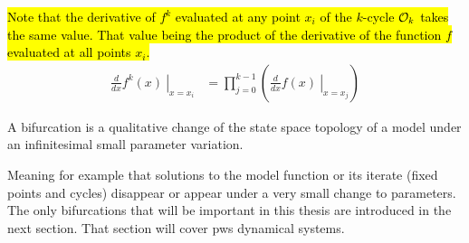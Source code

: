 \hl{
	Note that the derivative of $f^k$ evaluated at any point $x_i$ of the $k$-cycle $\mathcal{O}_k$ takes the same value.
	That value being the product of the derivative of the function $f$ evaluated at all points $x_i$.
}
\begin{align}
	\left. \frac{d}{dx}f^k(x) \:\right|_{x = x_i} & = \prod_{j=0}^{k-1} \left( \left. \frac{d}{dx} f(x) \:\right|_{x = x_j} \right)
\end{align}


\begin{definition}[Bifurcation]
	A bifurcation is a qualitative change of the state space topology of a model under an infinitesimal small parameter variation.
\end{definition}
Meaning for example that solutions to the model function or its iterate (fixed points and cycles) disappear or appear under a very small change to parameters.
The only bifurcations that will be important in this thesis are introduced in the next section.
That section will cover \gls{pws} dynamical systems.
